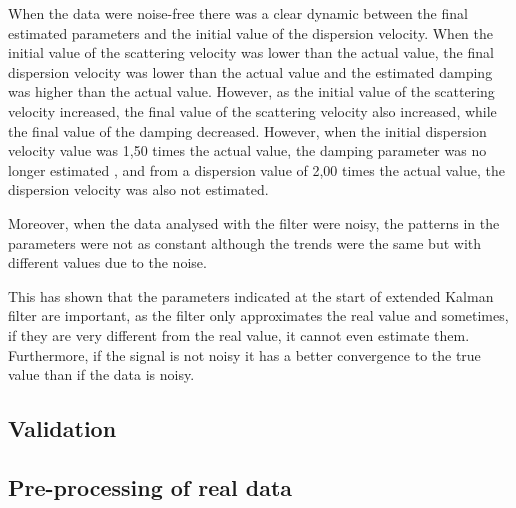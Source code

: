 \documentclass[12pt, a4paper]{article} %
\begin{document}
	When the data were noise-free there was a clear dynamic between the final estimated parameters and the initial value of the dispersion velocity. When the initial value of the scattering velocity was lower than the actual value, the final dispersion velocity was lower than the actual value and the estimated damping was higher than the actual value. However, as the initial value of the scattering velocity increased, the final value of the scattering velocity also increased, while the final value of the damping decreased. However, when the initial dispersion velocity value was 1,50 times the actual value, the damping parameter was no longer estimated , and from a dispersion value of 2,00 times the actual value, the dispersion velocity was also not estimated.
	
	Moreover, when the data analysed with the filter were noisy, the patterns in the parameters were not as constant although the trends were the same but with different values due to the noise.
	
	This has shown that the parameters indicated at the start of extended Kalman filter are important, as the filter only approximates the real value and sometimes, if they are very different from the real value, it cannot even estimate them. Furthermore, if the signal is not noisy it has a better convergence to the true value than if the data is noisy.
	
	\setlength{\parskip}{0mm}
	
	\subsection{Validation}
	
	\subsection{Pre-processing of real data}
	
\end{document}
